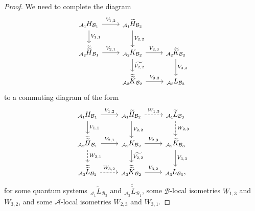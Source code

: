 \documentclass[11pt]{amsart}
\theoremstyle{definition}
\newcommand{\cl}[1]{\mathcal{#1}}
\providecommand{\wt}[1]{\widetilde{#1}}
\begin{document}
\begin{proof} We need to complete the diagram
\begin{equation*}
\begin{tikzcd}
_{\cl{A}_1}\hspace{-0.04cm}H_{\cl{B}_1}\arrow[d, "V_{1,1}"] \arrow[r, "V_{1,2}"] &_{\cl{A}_1}\hspace{-0.04cm}\wt{H}_{\cl{B}_2}\arrow[d, "V_{2,2}"] & \\
_{\cl{A}_2}\hspace{-0.04cm}\wt{\widetilde{H}}_{\cl{B}_1} \arrow[r, "V_{2,1}"] &_{\cl{A}_2}\hspace{-0.04cm}K_{\cl{B}_2}\arrow[r, "V_{2,3}"]\arrow[d, "\wt{V_{2,2}}"] & _{\cl{A}_2}\hspace{-0.04cm}\wt{K}_{\cl{B}_3}\arrow[d, "V_{3,3}"]\\
& _{\cl{A}_3}\hspace{-0.04cm}\wt{\wt{K}}_{\cl{B}_2}\arrow[r, "V_{3,2}"] & _{\cl{A}_3}\hspace{-0.04cm}L_{\cl{B}_3}
\end{tikzcd}
\end{equation*}
to a commuting diagram of the form
\begin{equation}\label{eq_diagdoub}
\begin{tikzcd}
_{\cl{A}_1}\hspace{-0.04cm}H_{\cl{B}_1}\arrow[d, "V_{1,1}"] \arrow[r, "V_{1,2}"] &_{\cl{A}_1}\hspace{-0.04cm}\wt{H}_{\cl{B}_2}\arrow[d, "V_{2,2}"]\arrow[r, dashed, "W_{1,3}"] & _{\cl{A}_1}\hspace{-0.04cm}\wt{L}_{\cl{B}_3}\arrow[d, dashed, "W_{2,3}"] \\
_{\cl{A}_2}\hspace{-0.04cm}\wt{\widetilde{H}}_{\cl{B}_1}\arrow[d, dashed, "W_{3,1}"] \arrow[r, "V_{2,1}"] &_{\cl{A}_2}\hspace{-0.04cm}K_{\cl{B}_2}\arrow[r, "V_{2,3}"]\arrow[d, "\wt{V_{2,2}}"] & _{\cl{A}_2}\hspace{-0.04cm}\wt{K}_{\cl{B}_3}\arrow[d, "V_{3,3}"]\\
_{\cl{A}_3}\hspace{-0.04cm}\wt{\wt{L}}_{\cl{B}_1}\arrow[r, dashed, "W_{3,2}"] & _{\cl{A}_3}\hspace{-0.04cm}\wt{\wt{K}}_{\cl{B}_2}\arrow[r, "V_{3,2}"] & _{\cl{A}_3}\hspace{-0.04cm}L_{\cl{B}_3},
\end{tikzcd}
\end{equation}
for some quantum systems $_{\cl{A}_1}\wt{L}_{\cl{B}_3}$ and $_{\cl{A}_3}\wt{\wt{L}}_{\cl{B}_1}$, 
some $\cl{B}$-local isometries $W_{1,3}$ and $W_{3,2}$, and 
some $\cl{A}$-local isometries $W_{2,3}$ and $W_{3,1}$.


\end{proof}
\end{document}
